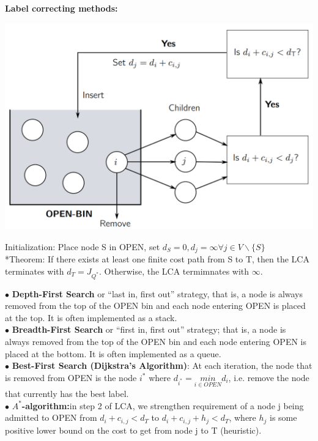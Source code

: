 \documentclass[10pt,landscape]{article}
\newenvironment{Figure}
{\par\medskip\noindent\minipage{\linewidth}}
{\endminipage\par\medskip}
\begin{document}
\begin{multicols*}{4}
\textbf{Label correcting methods:}\\
\begin{Figure}
	\centering
	\includegraphics[width=\linewidth]{pictures/LCM.png}
\end{Figure}
Initialization: Place node S in OPEN, set $d_S=0, d_j=\infty \forall j\in V \backslash\{S\}$\\
*Theorem:  If there exists at least one finite cost path
from S to T, then the LCA terminates with $d_T = J_{Q^{*}}$. Otherwise, the LCA termimnates with $\infty$.

$\bullet$ \textbf{Depth-First Search} or “last in, first out” strategy, that is, a node is always removed from the top of the OPEN bin and each node entering OPEN is placed at the top. It is often implemented as a stack.\\
$\bullet$ \textbf{Breadth-First Search} or “first in, first out” strategy; that is, a node is always removed from the top of the OPEN bin and each node entering OPEN is placed at the bottom. It is often implemented as a queue.\\
$\bullet$ \textbf{Best-First Search (Dijkstra’s Algorithm)}: At each iteration, the node
that is removed from OPEN is the node $i^{*}$ where $d_{i^{*}} = \underset{i \in OPEN}{min} d_i$, i.e. remove the node that currently has the best label.\\
$\bullet$ \textbf{$A^{*}$-algorithm:}in step 2 of LCA, we strengthen requirement of a node j being admitted to OPEN from $d_i+c_{i,j} < d_T$ to $d_i+c_{i,j}+h_j < d_T$, where $h_j$ is some positive lower bound on the cost to get from node j to T (heuristic).



















\end{multicols*}
\end{document}

